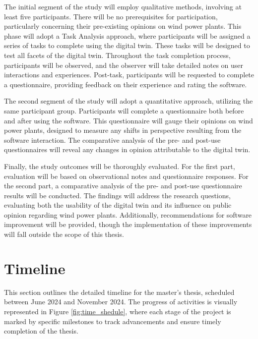 \documentclass[11pt, titlepage, a4paper]{article}
\begin{document}
\begin{linenumbers}
    The initial segment of the study will employ qualitative methods, involving at least five participants. There will be no prerequisites for participation, particularly concerning their pre-existing opinions on wind power plants. This phase will adopt a Task Analysis approach, where participants will be assigned a series of tasks to complete using the digital twin. These tasks will be designed to test all facets of the digital twin. Throughout the task completion process, participants will be observed, and the observer will take detailed notes on user interactions and experiences. Post-task, participants will be requested to complete a questionnaire, providing feedback on their experience and rating the software.
    
    The second segment of the study will adopt a quantitative approach, utilizing the same participant group. Participants will complete a questionnaire both before and after using the software. This questionnaire will gauge their opinions on wind power plants, designed to measure any shifts in perspective resulting from the software interaction. The comparative analysis of the pre- and post-use questionnaires will reveal any changes in opinion attributable to the digital twin.
    
    Finally, the study outcomes will be thoroughly evaluated. For the first part, evaluation will be based on observational notes and questionnaire responses. For the second part, a comparative analysis of the pre- and post-use questionnaire results will be conducted. The findings will address the research questions, evaluating both the usability of the digital twin and its influence on public opinion regarding wind power plants. Additionally, recommendations for software improvement will be provided, though the implementation of these improvements will fall outside the scope of this thesis.
    

    \section{Timeline}
    This section outlines the detailed timeline for the master's thesis, scheduled between June 2024 and November 2024.
    The progress of activities is visually represented in Figure \ref{fig:time_shedule}, where each stage of the project is marked by specific milestones to track advancements and ensure timely completion of the thesis.


\end{linenumbers}
\end{document}
